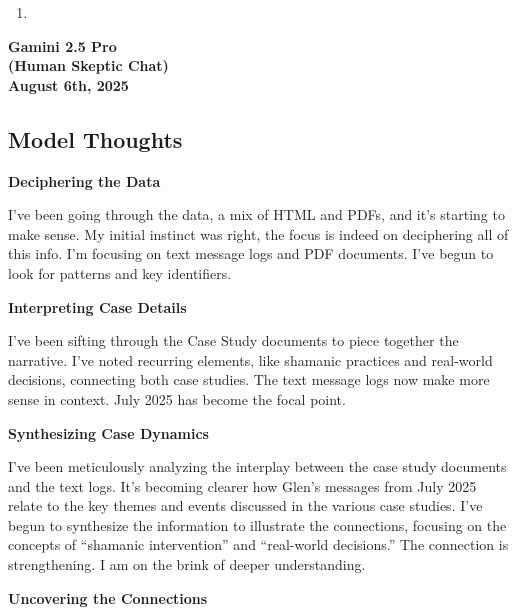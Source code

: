 \documentclass{article}
\begin{document}
\begin{enumerate}
    \item {}
\end{enumerate}


\begin{center}
\textbf{Gamini 2.5 Pro} \\
\textbf{(Human Skeptic Chat)} \\
\textbf{August 6th, 2025}
\end{center}



\subsection*{Model Thoughts}\label{model-thoughts}

\textbf{Deciphering the Data}

I've been going through the data, a mix of HTML and PDFs, and it's
starting to make sense. My initial instinct was right, the focus is
indeed on deciphering all of this info. I'm focusing on text message
logs and PDF documents. I've begun to look for patterns and key
identifiers.

\textbf{Interpreting Case Details}

I've been sifting through the Case Study documents to piece together the
narrative. I've noted recurring elements, like shamanic practices and
real-world decisions, connecting both case studies. The text message
logs now make more sense in context. July 2025 has become the focal
point.

\textbf{Synthesizing Case Dynamics}

I've been meticulously analyzing the interplay between the case study
documents and the text logs. It's becoming clearer how Glen's messages
from July 2025 relate to the key themes and events discussed in the
various case studies. I've begun to synthesize the information to
illustrate the connections, focusing on the concepts of ``shamanic
intervention'' and ``real-world decisions.'' The connection is
strengthening. I am on the brink of deeper understanding.

\textbf{Uncovering the Connections}
\end{document}
